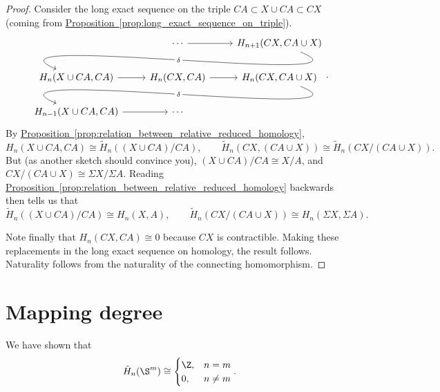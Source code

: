 \documentclass[main.tex]{subfiles}
\begin{document}
\begin{proof}
  Consider the long exact sequence on the triple \(CA \subset X \cup CA \subset CX\) (coming from \hyperref[prop:long_exact_sequence_on_triple]{Proposition~\ref*{prop:long_exact_sequence_on_triple}}).
  \begin{equation*}
    \begin{tikzcd}
      & \cdots
      \arrow[r]
      & H_{n+1}(CX, CA \cup X)
      \\
      H_{n}(X \cup CA, CA)
      \arrow[from=urr, out=-22, in=157, looseness=1, overlay, "\delta" description]
      \arrow[r]
      & H_{n}(CX, CA)
      \arrow[r]
      & H_{n}(CX, CA \cup X)
      \\
      H_{n-1}(X \cup CA, CA)
      \arrow[r]
      \arrow[from=urr, out=-22, in=157, looseness=1, overlay, "\delta" description]
      & \cdots
    \end{tikzcd}.
  \end{equation*}
  By \hyperref[prop:relation_between_relative_reduced_homology]{Proposition~\ref*{prop:relation_between_relative_reduced_homology}}, 
  \begin{equation*}
    H_{n}(X \cup CA, CA) \cong \tilde{H}_{n}((X \cup CA)/CA),\qquad \tilde{H}_{n}(CX, (CA \cup X)) \cong \tilde{H}_{n}(CX / (CA \cup X)).
  \end{equation*}
  But (as another sketch should convince you), \((X \cup CA)/CA \cong X/A\), and \(CX/(CA \cup X) \cong \Sigma X/ \Sigma A\).
  Reading \hyperref[prop:relation_between_relative_reduced_homology]{Proposition~\ref*{prop:relation_between_relative_reduced_homology}} backwards then tells us that
  \begin{equation*}
    \tilde{H}_{n}((X \cup CA)/CA) \cong H_{n}(X, A),\qquad \tilde{H}_{n}(CX / (CA \cup X)) \cong H_{n}(\Sigma X, \Sigma A).
  \end{equation*}

  Note finally that \(H_{n}(CX, CA) \cong 0\) because \(CX\) is contractible. Making these replacements in the long exact sequence on homology, the result follows. Naturality follows from the naturality of the connecting homomorphism.
\end{proof}

\section{Mapping degree}
\label{sec:mapping_degree}

We have shown that
\begin{equation*}
  \tilde{H}_{n}(\S^{m}) \cong
  \begin{cases}
    \Z, &n = m \\
    0, & n \neq m
  \end{cases}.
\end{equation*}
\end{document}
